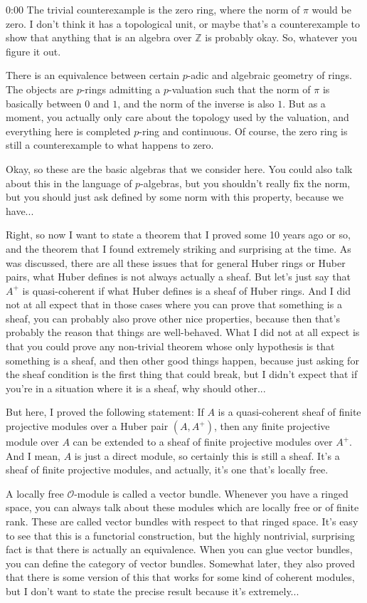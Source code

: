 \begin{unfinished}{0:00}
The trivial counterexample is the zero ring, where the norm of $\pi$ would be zero. I don't think it has a topological unit, or maybe that's a counterexample to show that anything that is an algebra over $\mathbb{Z}$ is probably okay. So, whatever you figure it out.

There is an equivalence between certain $p$-adic and algebraic geometry of rings. The objects are $p$-rings admitting a $p$-valuation such that the norm of $\pi$ is basically between $0$ and $1$, and the norm of the inverse is also $1$. But as a moment, you actually only care about the topology used by the valuation, and everything here is completed $p$-ring and continuous. Of course, the zero ring is still a counterexample to what happens to zero.

Okay, so these are the basic algebras that we consider here. You could also talk about this in the language of $p$-algebras, but you shouldn't really fix the norm, but you should just ask defined by some norm with this property, because we have...

Right, so now I want to state a theorem that I proved some 10 years ago or so, and the theorem that I found extremely striking and surprising at the time. As was discussed, there are all these issues that for general Huber rings or Huber pairs, what Huber defines is not always actually a sheaf. But let's just say that $A^+$ is quasi-coherent if what Huber defines is a sheaf of Huber rings. And I did not at all expect that in those cases where you can prove that something is a sheaf, you can probably also prove other nice properties, because then that's probably the reason that things are well-behaved. What I did not at all expect is that you could prove any non-trivial theorem whose only hypothesis is that something is a sheaf, and then other good things happen, because just asking for the sheaf condition is the first thing that could break, but I didn't expect that if you're in a situation where it is a sheaf, why should other...

But here, I proved the following statement: If $A$ is a quasi-coherent sheaf of finite projective modules over a Huber pair $(A,A^+)$, then any finite projective module over $A$ can be extended to a sheaf of finite projective modules over $A^+$. And I mean, $A$ is just a direct module, so certainly this is still a sheaf. It's a sheaf of finite projective modules, and actually, it's one that's locally free.

A locally free $\mathcal{O}$-module is called a vector bundle. Whenever you have a ringed space, you can always talk about these modules which are locally free or of finite rank. These are called vector bundles with respect to that ringed space. It's easy to see that this is a functorial construction, but the highly nontrivial, surprising fact is that there is actually an equivalence. When you can glue vector bundles, you can define the category of vector bundles. Somewhat later, they also proved that there is some version of this that works for some kind of coherent modules, but I don't want to state the precise result because it's extremely...


\end{unfinished}
